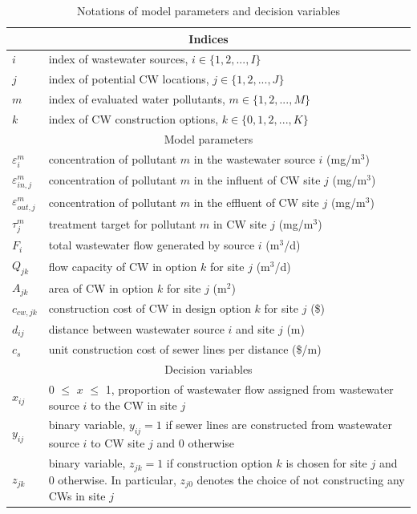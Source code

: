 \documentclass[preprint,12pt,authoryear]{elsarticle}
\begin{document}
\begin{table}[!htpb]
	\setlength{\extrarowheight}{1.5mm}
	\caption{Notations of model parameters and decision variables}
	\begin{tabular}{|p{1.5cm} p{16cm}|}
		\hline
		\multicolumn{2}{|c|}{Indices} \\
		\hline
		$i$ & index of wastewater sources, $i\in\{1,2,...,I\}$\\
		$j$ & index of potential CW locations, $j\in\{1,2,...,J\}$ \\
		$m$ & index of evaluated water pollutants, $m\in\{1,2,...,M\}$\\
		$k$ & index of CW construction options, $k\in\{0,1,2,...,K\}$\\
		\hline
		\multicolumn{2}{|c|}{Model parameters} \\
		\hline
		$\varepsilon_i^m$ & concentration of pollutant $m$ in the wastewater source $i$ (mg/m$^3$)\\
		$\varepsilon_{in,j}^m$ & concentration of pollutant $m$ in the influent of CW site $j$ (mg/m$^3$)\\
		$\varepsilon_{out,j}^m$ & concentration of pollutant $m$ in the effluent of CW site $j$ (mg/m$^3$)\\
		$\tau_{j}^m$ & treatment target for pollutant $m$ in CW site $j$ (mg/m$^3$)\\
		$F_{i}$ & total wastewater flow generated by source $i$ (m$^3$/d)\\
		$Q_{jk}$ &  flow capacity of CW in option $k$ for site $j$ (m$^3$/d)\\
		$A_{jk}$ & area of CW in option $k$ for site $j$ (m$^2$)\\		$c_{cw,jk}$ & construction cost of CW in design option $k$ for site $j$ (\$) \\	
		$d_{ij}$ & distance between wastewater source $i$ and site $j$ (m)\\
		$c_s$ & unit construction cost of sewer lines per distance (\$/m)\\
		\hline
		\multicolumn{2}{|c|}{Decision variables}\\
		\hline	
		$x_{ij}$ & 0 $\leq$ $x$ $\leq$ 1, proportion of wastewater flow assigned from wastewater source $i$ to the CW in site $j$ \\
		$y_{ij}$ & binary variable, $y_{ij}=1$ if sewer lines are constructed from wastewater source $i$ to CW site $j$ and $0$ otherwise\\
		$z_{jk}$ & binary variable, $z_{jk}=1$ if construction option $k$ is chosen for site $j$ and $0$ otherwise. In particular, $z_{j0}$ denotes the choice of not constructing any CWs in site $j$\\
		\hline	
	\end{tabular}

	\label{table:modelparameter}
\end{table}
\end{document}
